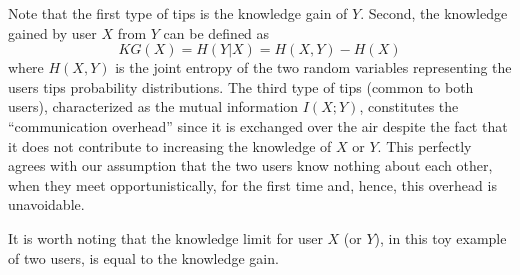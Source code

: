 \documentclass[12pt,epsf]{article}
\theoremstyle{definition}
\begin{document}
Note that the first type of tips is the knowledge gain of $Y$. Second, the knowledge gained by user $X$ from $Y$ can be defined as
%
\vspace{-0.5 cm}
\begin{equation}
KG(X) = H(Y|X) = H(X,Y) - H(X)
\end{equation}
where $H(X,Y)$ is the joint entropy of the two random variables representing the users tips probability distributions.
%
%
The third type of tips (common to both users), characterized as the mutual information $I(X;Y)$, constitutes the ``communication overhead'' since it is exchanged over the air despite the fact that it does not contribute to increasing the knowledge of $X$ or $Y$. This perfectly 
agrees with our assumption that the two users know nothing about each other, when they meet opportunistically, for the first time and, hence, this overhead is unavoidable.
%

It is worth noting that the knowledge limit for user $X$ (or $Y$), in this toy example of two users, is equal to the knowledge gain. 
\vspace{-0.3 cm} 
\end{document}
